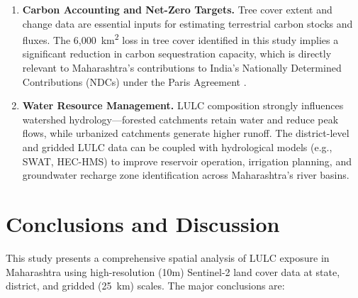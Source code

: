 \documentclass[12pt,a4paper]{article}
\begin{document}
\begin{enumerate}
    \item \textbf{Carbon Accounting and Net-Zero Targets.} Tree cover extent and change data are essential inputs for estimating terrestrial carbon stocks and fluxes. The 6,000~km\textsuperscript{2} loss in tree cover identified in this study implies a significant reduction in carbon sequestration capacity, which is directly relevant to Maharashtra's contributions to India's Nationally Determined Contributions (NDCs) under the Paris Agreement \citep{bonan2008forests}.

    \item \textbf{Water Resource Management.} LULC composition strongly influences watershed hydrology---forested catchments retain water and reduce peak flows, while urbanized catchments generate higher runoff. The district-level and gridded LULC data can be coupled with hydrological models (e.g., SWAT, HEC-HMS) to improve reservoir operation, irrigation planning, and groundwater recharge zone identification across Maharashtra's river basins.
\end{enumerate}

\section{Conclusions and Discussion}

This study presents a comprehensive spatial analysis of LULC exposure in Maharashtra using high-resolution (10m) Sentinel-2 land cover data at state, district, and gridded (25~km) scales. The major conclusions are:
\end{document}
